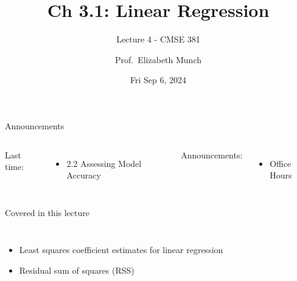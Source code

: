 \documentclass[aspectratio=169,usenames,dvipsnames]{beamer}
\begin{document}
\title[]{Ch 3.1: Linear Regression}
\subtitle{Lecture 4 - CMSE 381}
\date{Fri Sep 6, 2024}



\author[Dr.~Munch]{Prof.~Elizabeth Munch}

\begin{frame}
 \titlepage


\end{frame}
\begin{frame}[c]{Announcements}

\begin{columns}
\centering

	Last time:
	\begin{itemize}
		\item 2.2 Assessing Model Accuracy
	\end{itemize}
\centering

	Announcements:
	\begin{itemize}
		\item Office Hours
	\end{itemize}
\end{columns}

\end{frame}
\begin{frame}[c]{Covered in this lecture }

\begin{columns}
\centering
\begin{itemize}
	\item Least squares coefficient estimates for linear regression
	\item Residual sum of squares (RSS)
\end{itemize}
\centering

\end{columns}

\end{frame}
\end{document}
